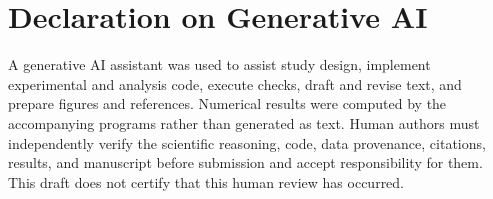 \documentclass{svproc}
\begin{document}
\section*{Declaration on Generative AI}
A generative AI assistant was used to assist study design, implement experimental and analysis code, execute checks, draft and revise text, and prepare figures and references. Numerical results were computed by the accompanying programs rather than generated as text. Human authors must independently verify the scientific reasoning, code, data provenance, citations, results, and manuscript before submission and accept responsibility for them. This draft does not certify that this human review has occurred.



\end{document}
